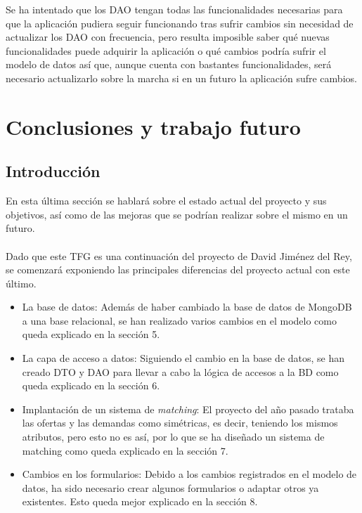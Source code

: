 \documentclass[11pt]{book}
\begin{document}
	Se ha intentado que los DAO tengan todas las funcionalidades necesarias para que la aplicación pudiera seguir funcionando tras sufrir cambios sin necesidad de actualizar los DAO con frecuencia, pero resulta imposible saber qué nuevas funcionalidades puede adquirir la aplicación o qué cambios podría sufrir el modelo de datos así que, aunque cuenta con bastantes funcionalidades, será necesario actualizarlo sobre la marcha si en un futuro la aplicación sufre cambios.

\chapter{Conclusiones y trabajo futuro}
\section{Introducción}
En esta última sección se hablará sobre el estado actual del proyecto y sus objetivos, así como de las mejoras que se podrían realizar sobre el mismo en un futuro.\\\\

Dado que este TFG es una continuación del proyecto de David Jiménez del Rey, se comenzará exponiendo las principales diferencias del proyecto actual con este último.
\begin{itemize}
	\item La base de datos: Además de haber cambiado la base de datos de MongoDB a una base relacional, se han realizado varios cambios en el modelo 		como queda explicado en la sección 5.
	\item La capa de acceso a datos: Siguiendo el cambio en la base de datos, se han creado DTO y DAO para llevar a cabo la lógica de accesos a la BD 			como queda explicado en la sección 6.
	\item Implantación de un sistema de \emph{matching}: El proyecto del año pasado trataba las ofertas y las demandas como simétricas, es decir, teniendo los mismos atributos, pero esto no 	es así, por lo que se ha diseñado un sistema de matching como queda explicado en la sección 7.
	\item Cambios en los formularios: Debido a los cambios registrados en el modelo de datos, ha sido necesario crear algunos formularios o adaptar otros ya existentes. Esto queda mejor explicado en la sección 8.
\end{itemize}
\end{document}
